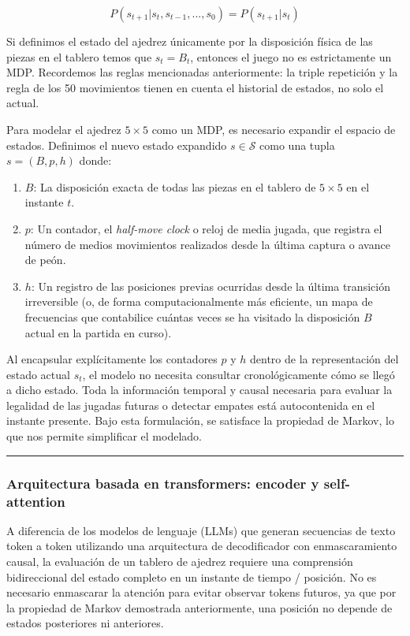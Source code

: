 \documentclass[12pt, a4paper]{article}
\begin{document}
$$P(s_{t+1} | s_t, s_{t-1}, ..., s_0) = P(s_{t+1} | s_t)$$

Si definimos el estado del ajedrez únicamente por la disposición física de las piezas en el tablero temos que $s_t = B_t$, entonces el juego no es estrictamente un MDP. Recordemos las reglas mencionadas anteriormente: la triple repetición y la regla de los 50 movimientos tienen en cuenta el historial de estados, no solo el actual.

Para modelar el ajedrez $5\times5$ como un MDP, es necesario expandir el espacio de estados. Definimos el nuevo estado expandido $s \in \mathcal{S}$ como una tupla $s = (B, p, h)$ donde:
\begin{enumerate}
    \item $B$: La disposición exacta de todas las piezas en el tablero de $5\times5$ en el instante $t$.
    \item $p$: Un contador, el \textit{half-move clock} o reloj de media jugada, que registra el número de medios movimientos realizados desde la última captura o avance de peón.
    \item $h$: Un registro de las posiciones previas ocurridas desde la última transición irreversible (o, de forma computacionalmente más eficiente, un mapa de frecuencias que contabilice cuántas veces se ha visitado la disposición $B$ actual en la partida en curso).
\end{enumerate}

Al encapsular explícitamente los contadores $p$ y $h$ dentro de la representación del estado actual $s_t$, el modelo no necesita consultar cronológicamente cómo se llegó a dicho estado. Toda la información temporal y causal necesaria para evaluar la legalidad de las jugadas futuras o detectar empates está autocontenida en el instante presente. Bajo esta formulación, se satisface la propiedad de Markov, lo que nos permite simplificar el modelado.

\rule{\textwidth}{0.2pt}
\subsubsection{Arquitectura basada en transformers: encoder y self-attention}\label{sec:transformer}

A diferencia de los modelos de lenguaje (LLMs) que generan secuencias de texto token a token utilizando una arquitectura de decodificador con enmascaramiento causal, la evaluación de un tablero de ajedrez requiere una comprensión bidireccional del estado completo en un instante de tiempo / posición. No es necesario enmascarar la atención para evitar observar tokens futuros, ya que por la propiedad de Markov demostrada anteriormente, una posición no depende de estados posteriores ni anteriores.
\end{document}

